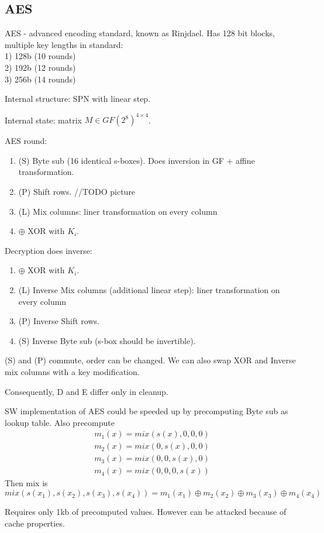 \subsection{AES}

\begin{definition}
	AES - advanced encoding standard, known as Rinjdael. Has 128 bit blocks, multiple key lengths in standard:\\
	1) 128b (10 rounds)\\
	2) 192b (12 rounds)\\
	3) 256b (14 rounds)

	Internal structure: SPN with linear step.

	Internal state: matrix $M \in GF(2^8)^{4 \times 4}$.
\end{definition}

AES round:
\begin{enumerate}
	\item (S) Byte sub (16 identical s-boxes). Does inversion in GF + affine transformation.
	\item (P) Shift rows. //TODO picture
	\item (L) Mix columns: liner transformation on every column
	\item $\oplus$ XOR with $K_i$.
\end{enumerate}
 Decryption does inverse:
\begin{enumerate}
	\item $\oplus$ XOR with $K_i$.
	\item (L) Inverse Mix columns (additional linear step): liner transformation on every column
	\item (P) Inverse Shift rows.
	\item (S) Inverse Byte sub (s-box should be invertible).
\end{enumerate}

\begin{observation}
	(S) and (P) commute, order can be changed.
	We can also swap XOR and Inverse mix columns with a key modification.

	Consequently, D and E differ only in cleanup.
\end{observation}

\begin{note}
	SW implementation of AES could be speeded up by precomputing Byte sub as lookup table.
	Also precompute
	\begin{gather*}
		m_1(x) = mix(s(x), 0, 0, 0) \\
		m_2(x) = mix(0, s(x), 0, 0) \\
		m_3(x) = mix(0, 0, s(x), 0) \\
		m_4(x) = mix(0, 0, 0, s(x))
	\end{gather*}
	Then mix is
	\[ mix (s(x_1), s(x_2), s(x_3), s(x_4)) = m_1(x_1) \oplus m_2(x_2) \oplus m_3(x_3) \oplus m_4(x_4) \]

	Requires only 1kb of precomputed values. However can be attacked because of cache properties.
\end{note}

